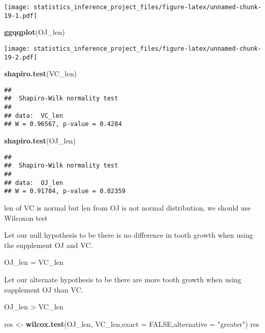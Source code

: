 \documentclass[]{article}
\newenvironment{Shaded}{\begin{snugshade}}{\end{snugshade}}
\newcommand{\KeywordTok}[1]{\textcolor[rgb]{0.13,0.29,0.53}{\textbf{#1}}}
\newcommand{\DataTypeTok}[1]{\textcolor[rgb]{0.13,0.29,0.53}{#1}}
\newcommand{\StringTok}[1]{\textcolor[rgb]{0.31,0.60,0.02}{#1}}
\newcommand{\OtherTok}[1]{\textcolor[rgb]{0.56,0.35,0.01}{#1}}
\newcommand{\NormalTok}[1]{#1}
\begin{document}
\texttt{[image: statistics\_inference\_project\_files/figure-latex/unnamed-chunk-19-1.pdf]}

\begin{Shaded}
\begin{Highlighting}[]
\KeywordTok{ggqqplot}\NormalTok{(OJ_len)}
\end{Highlighting}
\end{Shaded}

\texttt{[image: statistics\_inference\_project\_files/figure-latex/unnamed-chunk-19-2.pdf]}

\begin{Shaded}
\begin{Highlighting}[]
\KeywordTok{shapiro.test}\NormalTok{(VC_len)}
\end{Highlighting}
\end{Shaded}

\begin{verbatim}
## 
##  Shapiro-Wilk normality test
## 
## data:  VC_len
## W = 0.96567, p-value = 0.4284
\end{verbatim}

\begin{Shaded}
\begin{Highlighting}[]
\KeywordTok{shapiro.test}\NormalTok{(OJ_len)}
\end{Highlighting}
\end{Shaded}

\begin{verbatim}
## 
##  Shapiro-Wilk normality test
## 
## data:  OJ_len
## W = 0.91784, p-value = 0.02359
\end{verbatim}

len of VC is normal but len from OJ is not normal distribution, we
should use Wilcoxon test

Let our null hypothesis to be there is no difference in tooth growth
when using the supplement OJ and VC.

OJ\_len = VC\_len

Let our alternate hypothesis to be there are more tooth growth when
using supplement OJ than VC.

OJ\_len \textgreater{} VC\_len

\begin{Shaded}
\begin{Highlighting}[]
\NormalTok{res <-}\StringTok{ }\KeywordTok{wilcox.test}\NormalTok{(OJ_len, VC_len,}\DataTypeTok{exact =} \OtherTok{FALSE}\NormalTok{,}\DataTypeTok{alternative =} \StringTok{"greater"}\NormalTok{)}
\NormalTok{res}
\end{Highlighting}
\end{Shaded}
\end{document}
